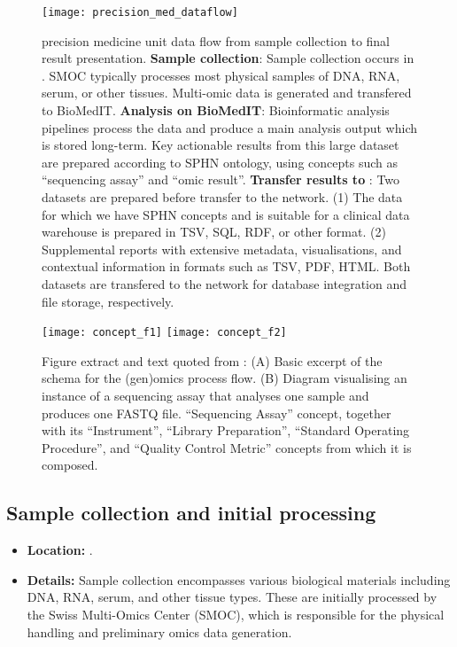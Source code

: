 \begin{figure}[h] \hspace*{0cm} 
\begin{center}
	\texttt{[image: precision\_med\_dataflow]}
	\caption{precision medicine unit data flow from sample collection to final result presentation. \textbf{Sample collection}: Sample collection occurs in \kispi. SMOC typically processes most physical samples of DNA, RNA, serum, or other tissues. Multi-omic data is generated and transfered to BioMedIT. \textbf{Analysis on BioMedIT}: Bioinformatic analysis pipelines process the data and produce a main analysis output which is stored long-term. 
	Key actionable results from this large dataset are prepared according to SPHN ontology, using concepts such as ``sequencing assay'' and ``omic result''. 
	\textbf{Transfer results to \kispi}:
	Two datasets are prepared before transfer to the \kispi network. (1) The data for which we have SPHN concepts and is suitable for a clinical data warehouse is prepared in TSV, SQL, RDF, or other format. (2) Supplemental reports with extensive metadata, visualisations, and contextual information in formats such as TSV, PDF, HTML. Both datasets are transfered to the \kispi network for database integration and file storage, respectively.}
	\label{fig:precision_med_dataflow}
\end{center}
\end{figure}

\begin{figure}[h] \hspace*{0cm} 
\begin{center}
	\texttt{[image: concept\_f1]}
	\texttt{[image: concept\_f2]}
	\caption{Figure extract and text quoted from \citet{van2023bridging}: (A) Basic excerpt of the schema for the (gen)omics process flow. (B) Diagram visualising an instance of a sequencing assay that analyses one sample and produces one FASTQ file. ``Sequencing Assay'' concept, together with its ``Instrument'', ``Library Preparation'', ``Standard Operating Procedure'', and ``Quality Control Metric'' concepts from which it is composed.}
	\label{fig:concept}
\end{center}
\end{figure}
\clearpage

\subsection{Sample collection and initial processing}
\begin{itemize}
    \item \textbf{Location:} \kispi.
    \item \textbf{Details:} Sample collection encompasses various biological materials including DNA, RNA, serum, and other tissue types. These are initially processed by the Swiss Multi-Omics Center (SMOC), which is responsible for the physical handling and preliminary omics data generation.
\end{itemize}

